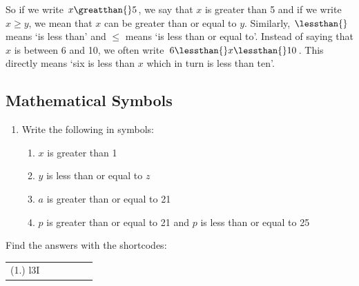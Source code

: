    \par
      \label{m38346*id180360}So if we write $x\greatthan{}5$, we say that $x$ is greater than 5 and if we write $x\ge y$, we mean that $x$ can be greater than or equal to $y$. Similarly, $\lessthan{}$ means `is less than' and $\le $ means `is less than or equal to'. Instead of saying that $x$ is between 6 and 10, we often write $6\lessthan{}x\lessthan{}10$. This directly means `six is less than $x$\hspace{1ex} which in turn is less than ten'.\par 
\label{m38346*secfhsst!!!underscore!!!id2615}
            \subsection{  Mathematical Symbols }
            \nopagebreak
      \label{m38346*id180483}\begin{enumerate}[noitemsep, label=\textbf{\arabic*}. ] 
            \label{m38346*uid76}\item Write the following in symbols:
\label{m38346*id180497}\begin{enumerate}[noitemsep, label=\textbf{\alph*}. ] 
            \label{m38346*uid77}\item $x$ is greater than 1
\label{m38346*uid78}\item $y$ is less than or equal to $z$\label{m38346*uid79}\item $a$ is greater than or equal to 21
\label{m38346*uid80}\item $p$ is greater than or equal to 21 and $p$ is less than or equal to 25
\end{enumerate}
        \hspace{1ex}        \end{enumerate}
\par {} Find the answers with the shortcodes:
 \par \begin{tabular}[h]{cccccc}
 (1.) l3I  & \end{tabular}
